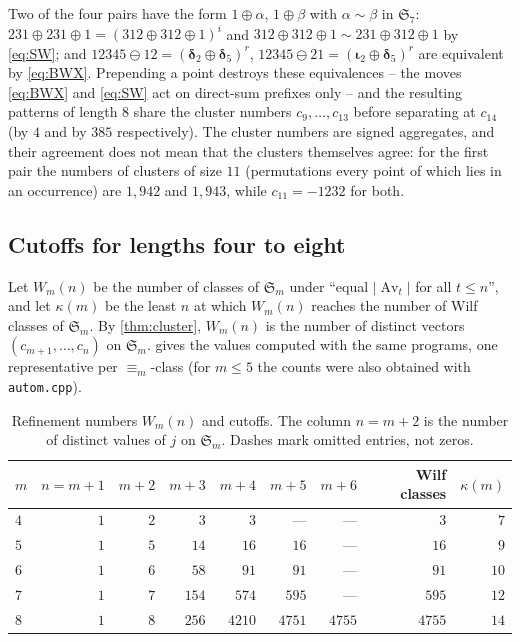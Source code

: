 \documentclass[11pt,reqno]{amsart}
\theoremstyle{plain}
\theoremstyle{definition}
\theoremstyle{remark}
\newcommand{\Av}{\operatorname{Av}}
\let\greekiota\iota
\renewcommand{\iota}{\boldsymbol{\greekiota}}
\newcommand{\dd}{\boldsymbol{\delta}}
\newcommand{\Sym}{\mathfrak{S}}
\begin{document}
Two of the four pairs have the form $1\oplus\alpha$, $1\oplus\beta$ with $\alpha\sim\beta$ in $\Sym_7$: $231\oplus231\oplus1=(312\oplus312\oplus1)^{i}$ and $312\oplus312\oplus1\sim231\oplus312\oplus1$ by \eqref{eq:SW}; and $12345\ominus12=(\dd_2\oplus\dd_5)^{r}$, $12345\ominus21=(\iota_2\oplus\dd_5)^{r}$ are equivalent by \eqref{eq:BWX}. Prepending a point destroys these equivalences -- the moves \eqref{eq:BWX} and \eqref{eq:SW} act on direct-sum prefixes only -- and the resulting patterns of length $8$ share the cluster numbers $c_9,\dots,c_{13}$ before separating at $c_{14}$ (by $4$ and by $385$ respectively). The cluster numbers are signed aggregates, and their agreement does not mean that the clusters themselves agree: for the first pair the numbers of clusters of size $11$ (permutations every point of which lies in an occurrence) are $1{,}942$ and $1{,}943$, while $c_{11}=-1232$ for both.

\subsection{Cutoffs for lengths four to eight}\label{sec:cutoff}
Let $W_m(n)$ be the number of classes of $\Sym_m$ under ``equal $|\Av_t|$ for all $t\le n$'', and let $\kappa(m)$ be the least $n$ at which $W_m(n)$ reaches the number of Wilf classes of $\Sym_m$. By \cref{thm:cluster}, $W_m(n)$ is the number of distinct vectors $(c_{m+1},\dots,c_n)$ on $\Sym_m$.  gives the values computed with the same programs, one representative per $\equiv_m$-class (for $m\le5$ the counts were also obtained with \texttt{autom.cpp}).

\begin{table}[ht]
\centering\small
\begin{tabular}{@{}lrrrrrrrr@{}}
\toprule
$m$ & $n=m{+}1$ & $m{+}2$ & $m{+}3$ & $m{+}4$ & $m{+}5$ & $m{+}6$ & Wilf classes & $\kappa(m)$\\
\midrule
$4$ & $1$ & $2$ & $3$ & $3$ & --- & --- & $3$ & $7$\\
$5$ & $1$ & $5$ & $14$ & $16$ & $16$ & --- & $16$ & $9$\\
$6$ & $1$ & $6$ & $58$ & $91$ & $91$ & --- & $91$ & $10$\\
$7$ & $1$ & $7$ & $154$ & $574$ & $595$ & --- & $595$ & $12$\\
$8$ & $1$ & $8$ & $256$ & $4210$ & $4751$ & $4755$ & $4755$ & $14$\\
\bottomrule
\end{tabular}
\caption{Refinement numbers $W_m(n)$ and cutoffs. The column $n=m+2$ is the number of distinct values of $j$ on $\Sym_m$. Dashes mark omitted entries, not zeros.}\label{tab:cutoff}
\end{table}
\end{document}
